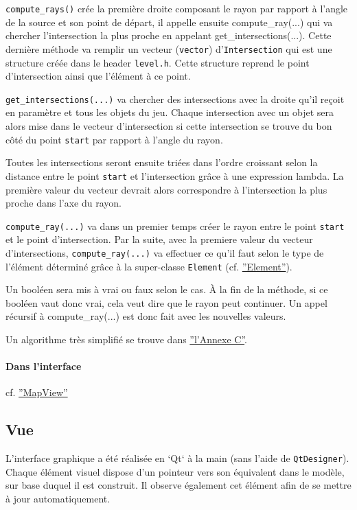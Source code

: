 \documentclass[]{article}
\begin{document}
\texttt{compute\_rays()} crée la première droite composant le rayon par rapport à l'angle de la 
source et son point de départ, il appelle ensuite compute\_ray(...) qui va chercher
l'intersection la plus proche en appelant get\_intersections(...). Cette dernière méthode
va remplir un vecteur (\texttt{vector}) d'\texttt{Intersection} qui est une structure créée dans 
le header \texttt{level.h}. Cette structure reprend le point d'intersection ainsi que l'élément à ce point.

\texttt{get\_intersections(...)} va chercher des intersections avec la droite qu'il reçoit en paramètre
et tous les objets du jeu. Chaque intersection avec un objet sera alors mise dans le vecteur d'intersection
si cette intersection se trouve du bon côté du point \texttt{start} par rapport à l'angle du rayon.

Toutes les intersections seront ensuite triées dans l'ordre croissant selon la distance entre le point \texttt{start} et
l'intersection grâce à une expression lambda.
La première valeur du vecteur devrait alors correspondre à l'intersection la plus proche dans l'axe du rayon.

\texttt{compute\_ray(...)} va dans un premier temps créer le rayon entre le point \texttt{start} et le point d'intersection.
Par la suite, avec la premiere valeur du vecteur d'intersections, 
\texttt{compute\_ray(...)} va effectuer ce qu'il faut selon le type de l'élément déterminé 
grâce à la super-classe \texttt{Element} (cf. \hyperref[Element]{''Element''}).

Un booléen sera mis à vrai ou faux selon le cas. À la fin de la méthode, si ce booléen vaut donc vrai, cela veut dire
que le rayon peut continuer. Un appel récursif à compute\_ray(...) est donc fait avec les nouvelles valeurs. 

Un algorithme très simplifié se trouve dans \hyperref[AnnexeC]{''l'Annexe C''}.
	
\paragraph{Dans l'interface} cf. \hyperref[MapView]{''MapView''}    

\subsection{Vue}

L’interface graphique a été réalisée en `Qt` à la main (sans l'aide de \texttt{QtDesigner}).
Chaque élément visuel dispose d’un pointeur vers son
équivalent dans le modèle, sur base duquel il est construit. Il observe également cet élément afin de se mettre
à jour automatiquement.
\end{document}

